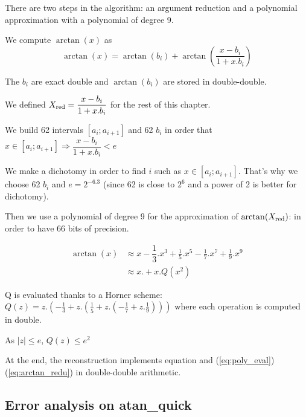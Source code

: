 There are two steps in the algorithm: an argument reduction and a polynomial
approximation with a polynomial of degree 9. 

We compute $\arctan(x)$ as 
\begin{equation}
\arctan(x) = \arctan( b_i ) + \arctan(\frac{x-b_i}{1+x.b_i}) \label{eq:arctan_redu}
\end{equation}

The $b_i$ are exact double and $\arctan(b_i)$ are stored in
double-double.

We defined $X_{\mathrm{red}} = \dfrac{x-b_i}{1+x.b_i}$ for the rest of this chapter.

We build 62 intervals $[a_i;a_{i+1}]$ and 62 $b_i$ in order that $ x \in
[a_i;a_{i+1}] \Rightarrow \dfrac{x-b_i}{1+x.b_i} < e$

We make a dichotomy in order to find $i$ such as $ x \in [a_i;a_{i+1}]
$. That's why we choose 62 $b_i$ and $e=2^{-6.3}$ (since 62 is close to
$2^6$ and a power of 2 is better for dichotomy).

Then we use a polynomial of degree 9 for the approximation of $\arctan(X_{\mathrm{red}})$:
in order to have 66 bits of precision.

\begin{equation}
\begin{split} \arctan(x)& \approx x - \dfrac{1}{3} .x^3 + \frac{1}{5}.x^5
- \frac{1}{7}.x^7 + \frac{1}{9}.x^9 \nonumber \\ \label{eq:poly_eval}
  & \approx x . + x.Q(x^2)
\end{split}
\end{equation}
 
Q is evaluated thanks to a Horner scheme:
$ Q(z) = z. (-\frac{1}{3} + z.(\frac{1}{5} + z.(-\frac{1}{7} +
z.\frac{1}{9}))) $
where each operation is computed in double.

As $|z| \leq e$, $Q(z) \leq e^2$

At the end, the reconstruction implements equation and (\ref{eq:poly_eval})  
(\ref{eq:arctan_redu}) in double-double
arithmetic.


\bigskip
\subsection{Error analysis on atan\_quick}

